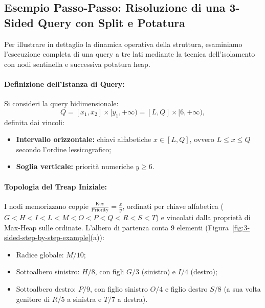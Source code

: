 \FloatBarrier
\subsection{Esempio Passo-Passo: Risoluzione di una 3-Sided Query con Split e Potatura}
\label{sec:treap-3sided-example}

Per illustrare in dettaglio la dinamica operativa della struttura, esaminiamo l'esecuzione completa di una query a tre lati mediante la tecnica dell'isolamento con nodi sentinella e successiva potatura heap.

\paragraph{Definizione dell'Istanza di Query:}
Si consideri la query bidimensionale:
\begin{equation}
  Q = [x_1, x_2] \times [y_1, +\infty) = [L, Q] \times [6, +\infty),
\end{equation}
definita dai vincoli:
\begin{itemize}
    \item \textbf{Intervallo orizzontale:} chiavi alfabetiche $x \in [L, Q]$, ovvero $L \le x \le Q$ secondo l'ordine lessicografico;
    \item \textbf{Soglia verticale:} priorit\`a numeriche $y \ge 6$.
\end{itemize}

\paragraph{Topologia del Treap Iniziale:}
I nodi memorizzano coppie $\frac{\text{Key}}{\text{Priority}} = \frac{x}{y}$, ordinati per chiave alfabetica ($G < H < I < L < M < O < P < Q < R < S < T$) e vincolati dalla propriet\`a di Max-Heap sulle ordinate. L'albero di partenza conta $9$ elementi (Figura~\ref{fig:3-sided-step-by-step-example}(a)):
\begin{itemize}
    \item Radice globale: $M / 10$;
    \item Sottoalbero sinistro: $H / 8$, con figli $G / 3$ (sinistro) e $I / 4$ (destro);
    \item Sottoalbero destro: $P / 9$, con figlio sinistro $O / 4$ e figlio destro $S / 8$ (a sua volta genitore di $R / 5$ a sinistra e $T / 7$ a destra).
\end{itemize}

